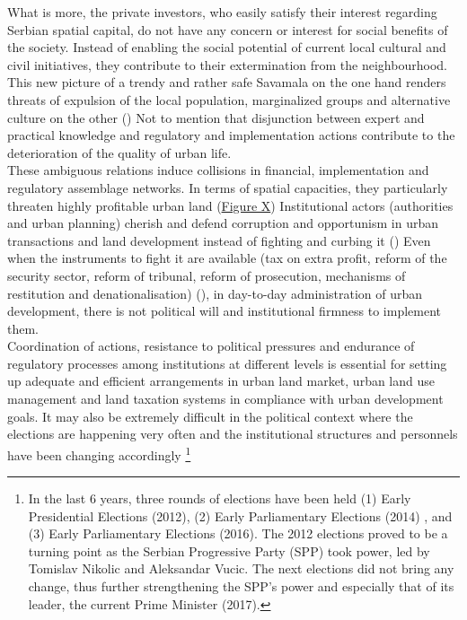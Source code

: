 \documentclass[11pt]{report}
\begin{document}
What is more, the private investors, who easily satisfy their interest regarding Serbian spatial capital, do not have any concern or interest for social benefits of the society. Instead of enabling the social potential of current local cultural and civil initiatives, they contribute to their extermination from the neighbourhood.
This new picture of a trendy and rather safe Savamala on the one hand renders threats of expulsion of the local population, marginalized groups and alternative culture on the other
(\href{Krusche}{\cite{krusche_bureau_2015}})
Not to mention that disjunction between expert and practical knowledge and regulatory and implementation actions contribute to the deterioration of the quality of urban life.
\\

These ambiguous relations induce collisions in financial, implementation and regulatory assemblage networks. In terms of spatial capacities, they particularly threaten highly profitable urban land (\href{FigureX}{Figure X})
Institutional actors (authorities and urban planning) cherish and defend corruption and opportunism in urban transactions and land development instead of fighting and curbing it (\href{NedovicBudic}{\cite{nedovic-budic_mornings_2011}})
Even when the instruments to fight it are available (tax on extra profit, reform of the security sector, reform of tribunal, reform of prosecution, mechanisms of restitution and denationalisation) (\href{Vujosevic}{\cite{vujosevic_postsocijalisticka_2010}}),
in day-to-day administration of urban
development, there is not political will and institutional firmness to implement them.
\\

Coordination of actions, resistance to political pressures and endurance of regulatory processes among institutions at different levels is essential for setting up adequate and efficient arrangements in urban land market, urban land use management and land taxation systems in compliance with urban development goals.
It may also be extremely difficult in the political context where the elections are happening very often and the institutional structures and personnels have been changing accordingly
\footnote{In the last 6 years, three rounds of elections have been held (1) Early Presidential Elections (2012), (2) Early Parliamentary Elections (2014) , and (3) Early Parliamentary Elections (2016).
The 2012 elections proved to be a turning point as the Serbian Progressive Party (SPP) took power, led by Tomislav Nikolic and Aleksandar Vucic. The next elections did not bring any change, thus further strengthening the SPP’s power and especially that of its leader, the current Prime Minister (2017).}
\\
\end{document}

